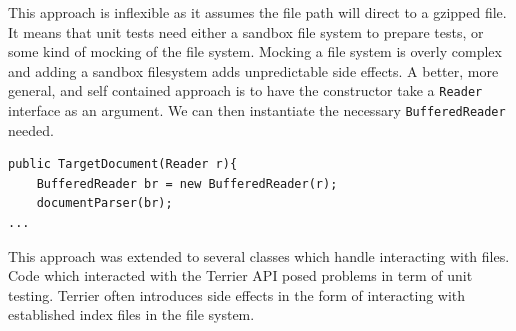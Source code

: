 \documentclass{l4proj}
\newcommand{\code}[1]{\texttt{#1}}
\begin{document}
This approach is inflexible as it assumes the file path will direct to a gzipped file. It means that unit tests need either a sandbox file system to prepare tests, or some kind of mocking of the file system. Mocking a file system is overly complex and adding a sandbox filesystem adds unpredictable side effects.
A better, more general, and self contained approach is to have the constructor take a \code{Reader} interface as an argument. We can then instantiate the necessary \code{BufferedReader} needed.

\begin{verbatim}
public TargetDocument(Reader r){
    BufferedReader br = new BufferedReader(r);
    documentParser(br);
...
\end{verbatim}

This approach was extended to several classes which handle interacting with files.
Code which interacted with the Terrier API posed problems in term of unit testing. Terrier often introduces side effects in the form of interacting with established index files in the file system.
\end{document}
